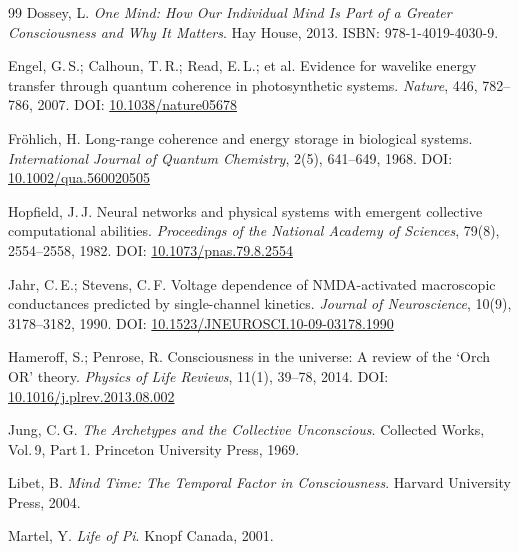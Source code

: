 \documentclass[11pt,a4paper]{article}
\begin{document}
\begin{thebibliography}{99}
Dossey, L.
\newblock \emph{One Mind: How Our Individual Mind Is Part of a Greater
  Consciousness and Why It Matters}.
\newblock Hay House, 2013.
\newblock ISBN: 978-1-4019-4030-9.

Engel, G.\,S.; Calhoun, T.\,R.; Read, E.\,L.; et al.
\newblock Evidence for wavelike energy transfer through quantum coherence in
  photosynthetic systems.
\newblock \emph{Nature}, 446, 782--786, 2007.
\newblock DOI: \href{https://doi.org/10.1038/nature05678}{10.1038/nature05678}

Fröhlich, H.
\newblock Long-range coherence and energy storage in biological systems.
\newblock \emph{International Journal of Quantum Chemistry}, 2(5), 641--649,
  1968.
\newblock DOI: \href{https://doi.org/10.1002/qua.560020505}{10.1002/qua.560020505}

Hopfield, J.\,J.
\newblock Neural networks and physical systems with emergent collective
  computational abilities.
\newblock \emph{Proceedings of the National Academy of Sciences},
  79(8), 2554--2558, 1982.
\newblock DOI: \href{https://doi.org/10.1073/pnas.79.8.2554}{10.1073/pnas.79.8.2554}

Jahr, C.\,E.; Stevens, C.\,F.
\newblock Voltage dependence of NMDA-activated macroscopic conductances
  predicted by single-channel kinetics.
\newblock \emph{Journal of Neuroscience}, 10(9), 3178--3182, 1990.
\newblock DOI: \href{https://doi.org/10.1523/JNEUROSCI.10-09-03178.1990}{10.1523/JNEUROSCI.10-09-03178.1990}

Hameroff, S.; Penrose, R.
\newblock Consciousness in the universe: A review of the `Orch OR' theory.
\newblock \emph{Physics of Life Reviews}, 11(1), 39--78, 2014.
\newblock DOI: \href{https://doi.org/10.1016/j.plrev.2013.08.002}{10.1016/j.plrev.2013.08.002}

Jung, C.\,G.
\newblock \emph{The Archetypes and the Collective Unconscious}.
\newblock Collected Works, Vol.\,9, Part\,1. Princeton University Press, 1969.

Libet, B.
\newblock \emph{Mind Time: The Temporal Factor in Consciousness}.
\newblock Harvard University Press, 2004.

Martel, Y.
\newblock \emph{Life of Pi}.
\newblock Knopf Canada, 2001.


\end{thebibliography}
\end{document}
